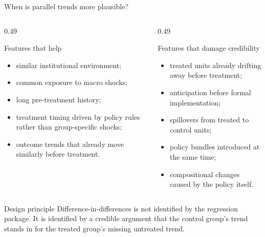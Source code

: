 \documentclass[10pt]{beamer}
\begin{document}
\begin{frame}{When is parallel trends more plausible?}
\label{slide:did_design}
\small
\begin{columns}[T]
\begin{column}{0.49\textwidth}
\begin{block}{Features that help}
\begin{itemize}
  \item similar institutional environment;
  \item common exposure to macro shocks;
  \item long pre-treatment history;
  \item treatment timing driven by policy rules rather than group-specific shocks;
  \item outcome trends that already move similarly before treatment.
\end{itemize}
\end{block}
\end{column}
\begin{column}{0.49\textwidth}
\begin{alertblock}{Features that damage credibility}
\begin{itemize}
  \item treated units already drifting away before treatment;
  \item anticipation before formal implementation;
  \item spillovers from treated to control units;
  \item policy bundles introduced at the same time;
  \item compositional changes caused by the policy itself.
\end{itemize}
\end{alertblock}
\end{column}
\end{columns}

\begin{exampleblock}{Design principle}
Difference-in-differences is not identified by the regression package. It is identified by a credible argument that the control group's trend stands in for the treated group's missing untreated trend.
\end{exampleblock}
\end{frame}
\end{document}
